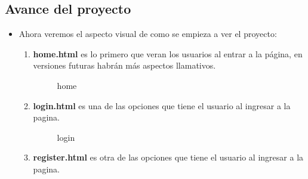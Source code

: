 \documentclass{article}
\begin{document}
    \subsection{Avance del proyecto}
    \begin{itemize}
        \item Ahora veremos el aspecto visual de como se empieza a ver el proyecto:
        \begin{enumerate}
            \item \textbf{home.html} es lo primero que veran los usuarios al entrar a la página, en versiones futuras habrán más aspectos llamativos.
            \begin{figure}[h]
            \centering
            \caption{home}
            \label{fig:ejemplo}
            \end{figure}
            \item \textbf{login.html} es una de las opciones que tiene el usuario al ingresar a la pagina.
            \begin{figure}[h]
            \centering
            \caption{login}
            \label{fig:ejemplo}
            \end{figure}
\newpage
            \item \textbf{register.html} es otra de las opciones que tiene el usuario al ingresar a la pagina.
            \begin{figure}[h]
            \centering

\end{figure}
\end{enumerate}
\end{itemize}
\end{document}
